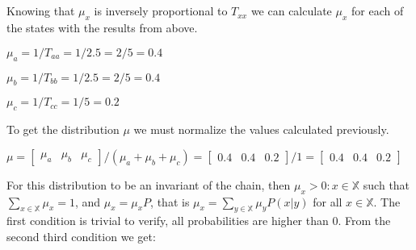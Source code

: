 \documentclass{article}
\begin{document}
\subsection{}

Knowing that $\mu_{x}$ is inversely proportional to $T_{xx}$ we can calculate $\mu_{x}$ for each of the states with the results from above.

\bigskip

$\mu_{a} = 1 / T_{aa} = 1 / 2.5 = 2 / 5 = 0.4$

$\mu_{b} = 1 / T_{bb} = 1 / 2.5 = 2 / 5 = 0.4$

$\mu_{c} = 1 / T_{cc} = 1 / 5 = 0.2$

\bigskip

To get the distribution $\mu$ we must normalize the values calculated previously.

\bigskip

$\mu = \begin{bmatrix} \mu_{a} & \mu_{b} & \mu_{c} \end{bmatrix} / (\mu_{a} + \mu_{b} + \mu_{c}) = \begin{bmatrix} 0.4 & 0.4 & 0.2 \end{bmatrix} / 1 = \begin{bmatrix} 0.4 & 0.4 & 0.2 \end{bmatrix}$

\bigskip

For this distribution to be an invariant of the chain, then $\mu_{x} > 0 : x \in \mathbb{X}$ such that $\sum_{x \in \mathbb{X}} \mu_{x} = 1$, and $\mu_{x} = \mu_{x}P$, that is $\mu_{x} = \sum_{y \in \mathbb{X}} \mu_{y}P(x | y)$ for all $x \in \mathbb{X}$.
The first condition is trivial to verify, all probabilities are higher than 0.
From the second third condition we get:
\end{document}
